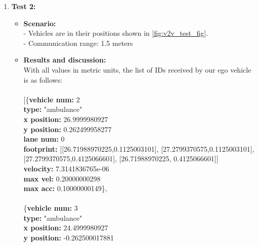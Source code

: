 \begin{enumerate}
\begin{itemize}
        \end{itemize}
    \item \textbf{Test 2:}
        \begin{itemize}
            \item \textbf{Scenario:}
            \\ - Vehicles are in their positions shown in \ref{fig:v2v_test_fig}.
            \\ - Communication range: 1.5 meters
            \item \textbf{Results and discussion:}
            \\ With all values in metric units, the list of IDs received by our ego vehicle is as follows:
    \\
    \\\hspace*{6.5mm} [\{\textbf{vehicle num:} 2
    \\\hspace*{10mm} \textbf{type:} "ambulance"
    \\\hspace*{10mm} \textbf{x position:} 26.9999980927
    \\\hspace*{10mm} \textbf{y position:} 0.262499958277
    \\\hspace*{10mm} \textbf{lane num:} 0
    \\\hspace*{10mm} \textbf{footprint:} [[26.71988970225,0.1125003101], [27.2799370575,0.1125003101], [27.2799370575,0.4125066601], [26.71988970225, 0.4125066601]]
    \\\hspace*{10mm} \textbf{velocity:} 7.3141836765e-06
    \\\hspace*{10mm} \textbf{max vel:} 0.20000000298
    \\\hspace*{10mm} \textbf{max acc:} 0.10000000149\},
    \\
    \\\hspace*{7.5mm} \{\textbf{vehicle num:} 3
    \\\hspace*{10mm} \textbf{type:} "ambulance"
    \\\hspace*{10mm} \textbf{x position:} 24.4999980927
    \\\hspace*{10mm} \textbf{y position:} -0.262500017881

\end{itemize}
\end{enumerate}
